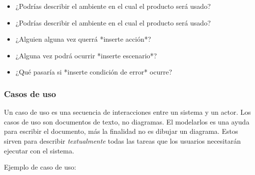 \begin{multicols}{2}
\begin{itemize}
                    \item ¿Podrías describir el ambiente en el cual el producto será usado?
                    \item ¿Podrías describir el ambiente en el cual el producto será usado?
                    \item ¿Alguien alguna vez querrá *inserte acción*?
                    \item ¿Alguna vez podrá ocurrir *inserte escenario*?
                    \item ¿Qué pasaría si *inserte condición de error* ocurre?
                \end{itemize}
            \end{multicols}
            
            \newpage
            
        \subsubsection*{Casos de uso}
        
        Un caso de uso es una secuencia de interacciones entre un sistema y un actor. Los casos de uso son documentos de texto, no diagramas. El modelarlos es una ayuda para escribir el documento, más la finalidad no es dibujar un diagrama. Estos sirven para describir \textit{textualmente} todas las tareas que los usuarios necesitarán ejecutar con el sistema.
        
        Ejemplo de caso de uso:
        
